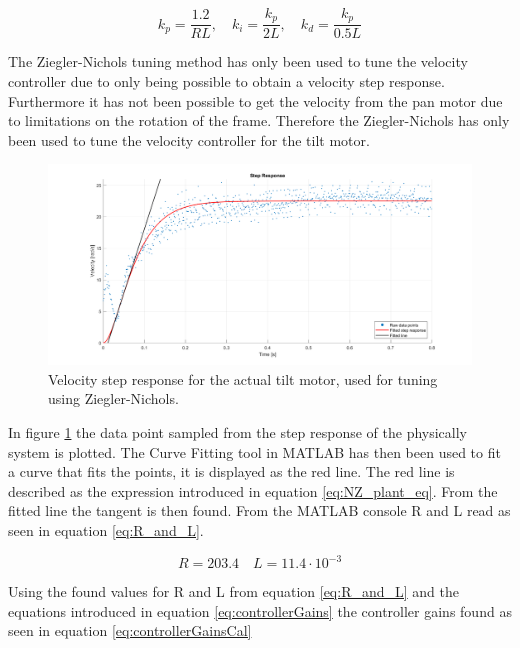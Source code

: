\documentclass[../../main.tex]{subfiles}
\begin{document}
\begin{equation}
k_p = \frac{1.2}{RL}, \quad k_i = \frac{k_p}{2L}, \quad k_d = \frac{k_p}{0.5L}
\label{eq:controllerGains}
\end{equation}

The Ziegler-Nichols tuning method has only been used to tune the velocity controller due to only being possible to obtain a velocity step response. Furthermore it has not been possible to get the velocity from the pan motor due to limitations on the rotation of the frame. Therefore the Ziegler-Nichols has only been used to tune the velocity controller for the tilt motor.

\begin{figure}
    \centering
    \includegraphics[width = 1\textwidth]{Sections/System_Design/Images/Ziegler-Nichols_Stepresponse.png}
    \caption{Velocity step response for the actual tilt motor, used for tuning using Ziegler-Nichols.}
    \label{fig:stepPlantNZ}
\end{figure}

In figure \ref{fig:stepPlantNZ} the data point sampled from the step response of the physically  system is plotted. The Curve Fitting tool in MATLAB has then been used to fit a curve that fits the points, it is displayed as the red line. The red line is described as the expression introduced in equation \ref{eq:NZ_plant_eq}.
From the fitted line the tangent is then found. From the MATLAB console R and L read as seen in equation \ref{eq:R_and_L}.

\begin{equation}
    R = 203.4 \quad L = 11.4 \cdot 10^{-3} 
    \label{eq:R_and_L}
\end{equation}

Using the found values for R and L from equation \ref{eq:R_and_L} and the equations introduced in equation \ref{eq:controllerGains} the controller gains found as seen in equation \ref{eq:controllerGainsCal}
\end{document}

